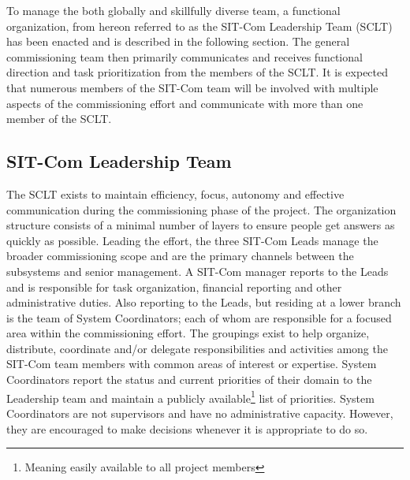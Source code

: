 \documentclass[SE,lsstdraft,authoryear,toc]{lsstdoc}
\begin{document}
To manage the both globally and skillfully diverse team, a functional organization, from hereon referred to as the SIT-Com Leadership Team (SCLT) has been enacted and is described in the following section.
The general commissioning team then primarily communicates and receives functional direction and task prioritization from the members of the SCLT.
It is expected that numerous members of the SIT-Com team will be involved with multiple aspects of the commissioning effort and communicate with more than one member of the SCLT.
%



\subsection{SIT-Com Leadership Team}
\label{sec:SCLT}

The SCLT exists to maintain efficiency, focus, autonomy and effective communication during the commissioning phase of the project.
The organization structure consists of a minimal number of layers to ensure people get answers as quickly as possible.
Leading the effort, the three SIT-Com Leads manage the broader commissioning scope and are the primary channels between the subsystems and senior management.
A SIT-Com manager reports to the Leads and is responsible for task organization, financial reporting and other administrative duties.
Also reporting to the Leads, but residing at a lower branch is the team of System Coordinators; each of whom are responsible for a focused area within the commissioning effort.
The groupings exist to help organize, distribute, coordinate and/or delegate responsibilities and activities among the SIT-Com team members with common areas of interest or expertise.
System Coordinators report the status and current priorities of their domain to the Leadership team and maintain a publicly available\footnote{Meaning easily available to all project members} list of priorities.
System Coordinators are not supervisors and have no administrative capacity.
However, they are encouraged to make decisions whenever it is appropriate to do so.
\end{document}
